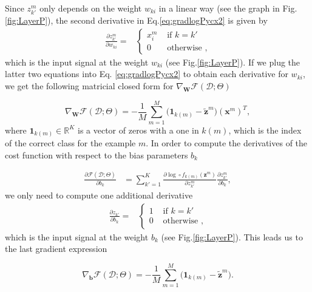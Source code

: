 %
Since $z^m_{k'}$ only depends on the weight $w_{ki}$ in a linear way (see the graph in Fig.\ref{fig:LayerP}), the second derivative in Eq.\ref{eq:gradlogPycx2} is given by
\begin{align}
\frac{\partial z^m_{k'}}{\partial w_{ki}} = 
  &\begin{cases}
      x_i^m  &  \mbox{ if } k = k'\\ 
      0    &  \mbox{ otherwise },
  \end{cases}
  \label{eq:partialLinear}
\end{align}
which is the input signal at the weight $w_{ki}$ (see Fig.\ref{fig:LayerP}).
If we plug the latter two equations into Eq. \ref{eq:gradlogPycx2} to obtain each 
derivative for $w_{ki}$, we get the following matricial closed form for 
$\nabla_\mathbf{W}\mathcal{F}(\mathcal{D};\Theta)$

\begin{equation}
\nabla_\mathbf{W}\mathcal{F}(\mathcal{D};\Theta) = -\frac{1}{M}\sum_{m=1}^{M} \Big(\mathrm{\mathbf{1}}_{k(m)} - \tilde{\mathbf{z}}^m \Big) \left(\mathbf{x}^m\right)^T,  
\label{gradWeigths}
\end{equation}
%
where $\mathrm{\mathbf{1}}_{k(m)} \in \mathbb{R}^{K}$ is a vector of zeros with a one in $k(m)$, which is 
the index of the correct class for the example $m$. In order to compute
the derivatives of the cost function with respect to the bias parameters $b_{k}$

\begin{align}
\frac{\partial \mathcal{F}(\mathcal{D};\Theta)}{\partial b_{k}} & = \sum_{k'=1}^{K}\frac{\partial \log \circ f_{k(m)}(\mathbf{z}^m)}{\partial z^m_{k'}}\frac{\partial z^m_{k'}}{\partial b_{k}},
\end{align}
%
we only need to compute one additional derivative
\begin{align}
\frac{\partial z_{k'}}{\partial b_{k}} = 
  &\begin{cases}
      1  &  \mbox{ if } k = k'\\ 
      0  &  \mbox{ otherwise },
  \end{cases} 
  \label{eqn:eqsilonq}
\end{align}
%
which is the input signal at the weight $b_k$ (see Fig.\ref{fig:LayerP}).
This leads us to the last gradient expression

\begin{equation}
\nabla_\mathbf{b}\mathcal{F}(\mathcal{D};\Theta) = -\frac{1}{M}\sum_{m=1}^{M} \Big(\mathrm{\mathbf{1}}_{k(m)} - \tilde{\mathbf{z}}^m \Big).
\label{eq:gradBias}
\end{equation}

